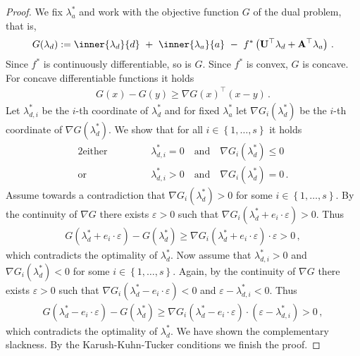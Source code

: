 \begin{proof}
  We fix 
  $
  \lambda_a^*
  $
  and
  work with the objective function $G$ of the dual problem, that is,
  \begin{gather}
    G
(\lambda_d)
:
=
    \inner
    {\lambda_d}
    {d}
    \ 
    +
    \ 
    \inner
    {\lambda_a}
    {a}
    \ 
    -
    \ 
    f^*
    \left( 
      \mathbf{U}^\top  \lambda_d
      +
      \mathbf{A}^\top  \lambda_a
    \right)
    \,.
  \end{gather}
  Since $f^*$ is continuously differentiable, so is $G$. 
  Since $f^*$ is convex, $G$ is concave.
  For concave differentiable functions it holds
  \begin{gather}
    G(x)-G(y)
    \ge
    \nabla
    G(x)^\top
    (x-y)
    \,.
  \end{gather}
Let
$\lambda_{d,i}^*$ be the $i$-th coordinate of $\lambda_d^*$ and for
fixed
$\lambda_a^*$ let
$
\nabla
G_i
(\lambda_d^*)
$
be the $i$-th coordinate of 
$
\nabla
G
(\lambda_d^*)
$.
We show that for all 
$
  i\in \left\{ 1,\ldots, s \right\}
$
it holds
\begin{alignat*}{2}
  \text{either}
  &
  &&
  \qquad
  \lambda_{d,i}^*
  = 0
  \quad
  \text{and}
  \quad
  \nabla
  G
  _i(
  \lambda_{d}^*
  ) \le 0
  \\
  \text{or}
  &
  &&
  \qquad
  \lambda_{d,i}^*
  > 0
  \quad
  \text{and}
  \quad
  \nabla
  G
  _i(
  \lambda_{d}^*
  ) = 0
  \,.
\end{alignat*}
Assume towards a contradiction that 
$
\nabla G_i(\lambda_d^*)>0
$
for some 
$
  i\in \left\{ 1,\ldots, s \right\}
$.
By the continuity of $\nabla G$ there exists $\varepsilon>0$ such that 
$
\nabla G_i(
\lambda_d^*
+
e_i\cdot \varepsilon
)
>
0
$.
Thus
\begin{gather}
  G
  (
\lambda_d^*
+
e_i\cdot \varepsilon
  )
  -
  G
  (
\lambda_d^*
  )
  \ge
\nabla G_i(
\lambda_d^*
+
e_i\cdot \varepsilon
)
\cdot
\varepsilon
>0
\,,
\end{gather}
which contradicts the optimality of 
$
\lambda_d^*
$.
Now assume that
$ \lambda_{d,i}^*>0 $ and 
$
  \nabla G_i(\lambda_d^*)< 0
$
for some
$
  i\in \left\{ 1,\ldots, s \right\}
$.
Again, by the 
continuity of $\nabla G$ there exists $\varepsilon>0$ such that
$
  \nabla G_i(\lambda_d^*-e_i\cdot \varepsilon)< 0
$
and
$
\varepsilon
-
\lambda_{d,i}^*
<0
$.
Thus
\begin{gather}
  G
  (
\lambda_d^*
-
e_i\cdot \varepsilon
  )
  -
  G
  (
\lambda_d^*
  )
  \ge
\nabla G_i(
\lambda_d^*
-
e_i\cdot \varepsilon
)
\cdot
\left( 
\varepsilon
-
\lambda_{d,i}^*
\right)
>0
\,,
\end{gather}
which contradicts the optimality of 
$
\lambda_d^*
$.
We have shown the complementary slackness.
By the Karush-Kuhn-Tucker conditions we finish the proof.
\end{proof}
